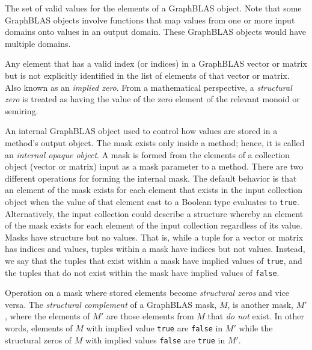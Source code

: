 The set of valid values for the elements of a GraphBLAS object.
Note that some GraphBLAS objects involve functions that map values from one or more input domains 
onto values in an output domain.  These GraphBLAS objects would have multiple domains.

  Any element that has a valid index (or indices) 
in a GraphBLAS vector or matrix but is not explicitly identified in the list of 
elements of that vector or matrix.  Also known as an \emph{implied zero}.  From 
a mathematical perspective, a \emph{structural zero} is treated as having the 
value of the zero element of the relevant monoid or semiring.

 An internal GraphBLAS object used to control how values 
are stored in a method's output object.  The mask exists only inside a method; hence,
it is called an \emph{internal opaque object}.  A mask is formed from the elements of
a collection object (vector or matrix) input as a mask parameter to a method. There
are two different operations for forming the internal mask.  The default 
behavior is that an element of the mask exists for each element that exists in the 
input collection object when the value of that element cast to a Boolean type evaluates to 
{\tt true}.  Alternatively, the input collection could describe a structure whereby an 
element of the mask exists for each element of the input collection regardless of its value.
Masks have structure but no values. That is,
while a tuple for a vector or matrix has indices and values,  tuples within a mask
have indices but not values. Instead, we say that the tuples that exist within a mask
have implied values of {\tt true}, and the tuples that do not exist within the mask have 
implied values of {\tt false}. 

 Operation on a mask where stored elements become
{\it structural zeros} and vice versa.  The \emph{structural complement} of a 
GraphBLAS mask, $M$, is another mask, $M'$, where the elements of $M'$
are those elements from $M$ that \emph{do not} exist.  In other words, 
elements of $M$ with implied value {\tt true} are {\tt false} in $M'$
while the structural zeros of $M$ with implied values {\tt false} 
are {\tt true} in $M'$.


\glossEnd



